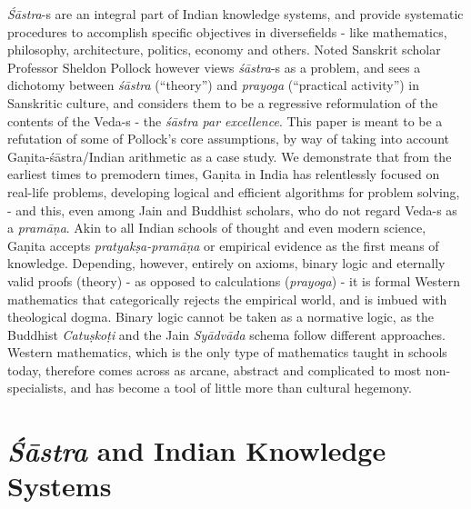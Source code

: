 {\sl Śāstra}-s are an integral part of Indian knowledge systems, and provide systematic procedures to accomplish specific objectives in diverse\break fields - like mathematics, philosophy, architecture, politics, economy and others. Noted Sanskrit scholar Professor Sheldon Pollock however views {\sl śāstra}-s as a problem, and sees a dichotomy between {\sl śāstra} (``theory'') and {\sl prayoga} (``practical activity'') in Sanskritic culture, and considers them to be a regressive reformulation of the contents of the Veda-s - the {\sl śāstra par excellence}. This paper is meant to be a refutation of some of Pollock's core assumptions, by way of taking into account Gaṇita-śāstra/Indian arithmetic as a case study. We demonstrate that from the earliest times to premodern times, Gaṇita in India has relentlessly focused on real-life problems, developing logical and efficient algorithms for problem solving, - and this, even among Jain and Buddhist scholars, who do not regard Veda-s as a {\sl pramāṇa}. Akin to all Indian schools of thought and even modern science, Gaṇita accepts {\sl pratyakṣa-pramāṇa} or empirical evidence as the first means of knowledge. Depending, however, entirely on axioms, binary logic and eternally valid proofs (theory) - as opposed to calculations ({\sl prayoga}) -  it is formal Western mathematics that categorically rejects the empirical world, and is imbued with theological dogma. Binary logic cannot be taken as a normative logic, as the Buddhist {\sl Catuṣkoṭi} and the Jain {\sl Syādvāda} schema follow different approaches. Western mathematics, which is the only type of mathematics taught in schools today, therefore comes across as arcane, abstract and complicated to most non-specialists, and has become a tool of little more than cultural hegemony.\\[-20pt] 

\section*{{\sl\bfseries Śāstra} and Indian Knowledge Systems}

